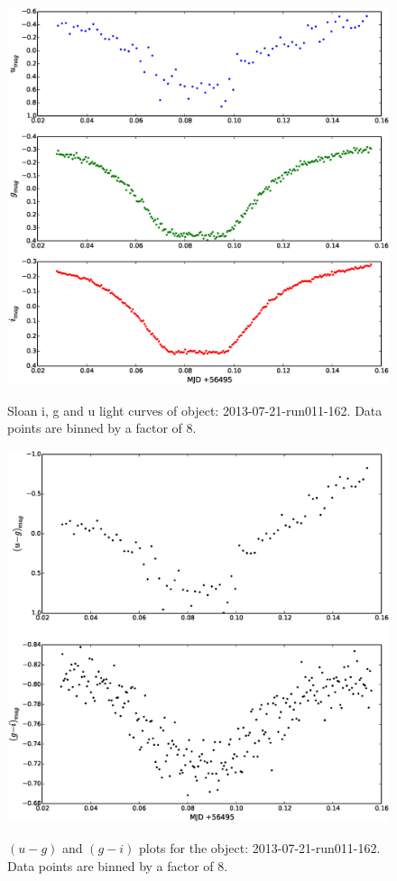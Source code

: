 \begin{figure}
  \center
  \includegraphics[width=120mm]{images/2013-07-21-run011-162_lightcurve-bin8.eps}
  \label{fig:2013-07-21-run011-162}
  \caption{Sloan i, g and u light curves of object: 2013-07-21-run011-162. Data points are binned by a factor of 8.}
\end{figure}

\begin{figure}
  \center
  \includegraphics[width=120mm]{images/2013-07-21-run011-162_colourcurve-bin8.eps}
  \label{fig:2013-07-21-run011-162-colour}
  \caption{$(u - g)$ and $(g - i)$ plots for the object: 2013-07-21-run011-162. Data points are binned by a factor of 8.}
\end{figure} 



